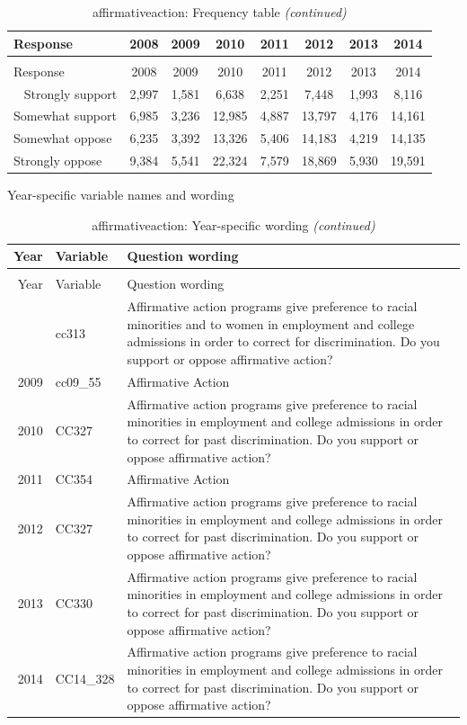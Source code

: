 \documentclass[12pt]{article}
\begin{document}
\begin{longtable}[t]{lccccccc}
\caption{\label{tab:unnamed-chunk-4}affirmativeaction: Frequency table}\\
\toprule
Response & 2008 & 2009 & 2010 & 2011 & 2012 & 2013 & 2014\\
\midrule
\endfirsthead
\caption[]{affirmativeaction: Frequency table \textit{(continued)}}\\
\toprule
Response & 2008 & 2009 & 2010 & 2011 & 2012 & 2013 & 2014\\
\midrule
\endhead
\
\endfoot
\bottomrule
\endlastfoot
Strongly support & 2,997 & 1,581 & 6,638 & 2,251 & 7,448 & 1,993 & 8,116\\
Somewhat support & 6,985 & 3,236 & 12,985 & 4,887 & 13,797 & 4,176 & 14,161\\
Somewhat oppose & 6,235 & 3,392 & 13,326 & 5,406 & 14,183 & 4,219 & 14,135\\
Strongly oppose & 9,384 & 5,541 & 22,324 & 7,579 & 18,869 & 5,930 & 19,591\\*
\end{longtable}

\endgroup{}

Year-specific variable names and wording

\begin{longtable}[t]{rl>{\raggedright\arraybackslash}p{10cm}}
\caption{\label{tab:unnamed-chunk-4}affirmativeaction: Year-specific wording}\\
\toprule
Year & Variable & Question wording\\
\midrule
\endfirsthead
\caption[]{affirmativeaction: Year-specific wording \textit{(continued)}}\\
\toprule
Year & Variable & Question wording\\
\midrule
\endhead
\
\endfoot
\bottomrule
\endlastfoot
2008 & cc313 & Affirmative action programs give preference to racial minorities and to women in employment and college admissions in order to correct for discrimination. Do you support or oppose affirmative action?\\
2009 & cc09\_55 & Affirmative Action\\
2010 & CC327 & Affirmative action programs give preference to racial minorities in employment and college admissions in order to correct for past discrimination. Do you support or oppose affirmative action?\\
2011 & CC354 & Affirmative Action\\
2012 & CC327 & Affirmative action programs give preference to racial minorities in employment and college admissions in order to correct for past discrimination. Do you support or oppose affirmative action?\\
2013 & CC330 & Affirmative action programs give preference to racial minorities in employment and college admissions in order to correct for past discrimination. Do you support or oppose affirmative action?\\
2014 & CC14\_328 & Affirmative action programs give preference to racial minorities in employment and college admissions in order to correct for past discrimination. Do you support or oppose affirmative action?\\*
\end{longtable}
\end{document}
